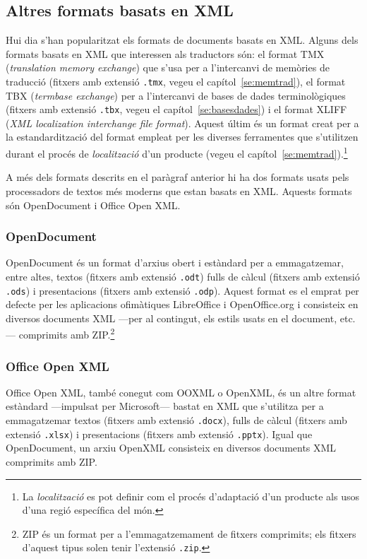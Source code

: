 \subsection{Altres formats basats en XML}
Hui dia s'han popularitzat els formats de documents basats en
XML. Alguns dels formats basats en XML que interessen als traductors
són: el format TMX (\emph{translation memory exchange}) que s'usa per
a l'intercanvi de memòries de traducció (fitxers amb extensió
\texttt{.tmx}, vegeu el capítol~\ref{se:memtrad}), el format TBX
(\emph{termbase exchange}) per a l'intercanvi de bases de dades
terminològiques (fitxers amb extensió \texttt{.tbx}, vegeu el
capítol~\ref{se:basesdades}) i el format XLIFF (\emph{XML localization
  interchange file format}). Aquest últim és un format creat per a la
estandardització del format empleat per les diverses ferramentes que
s'utilitzen durant el procés de \emph{localització} d'un producte
(vegeu el capítol~\ref{se:memtrad}).\footnote{La \emph{localització}
  es pot definir com el procés d'adaptació d'un producte als usos 
d'una regió específica del món.}

A més dels formats descrits en el paràgraf anterior hi ha dos formats
usats pels processadors de textos més moderns que estan basats en
XML. Aquests formats són OpenDocument i Office Open XML. 

\subsubsection{OpenDocument}
OpenDocument és un format d'arxius obert i estàndard per a
emmagatzemar, entre altes, textos (fitxers amb extensió \texttt{.odt})
fulls de càlcul (fitxers amb extensió \texttt{.ods}) i presentacions
(fitxers amb extensió \texttt{.odp}). Aquest format es el emprat per
defecte per les aplicacions ofimàtiques LibreOffice i OpenOffice.org i
consisteix en diversos documents XML ---per al contingut, els
estils usats en el document, etc.--- comprimits amb ZIP.\footnote{ZIP
  és un format per a l'emmagatzemament de fitxers comprimits; els
  fitxers d'aquest tipus solen tenir l'extensió \texttt{.zip}.}

\subsubsection{Office Open XML}
Office Open XML, també conegut com OOXML o OpenXML, és un altre format
estàndard ---impulsat per Microsoft--- bastat en XML que s'utilitza
per a emmagatzemar textos (fitxers amb extensió \texttt{.docx}), fulls
de càlcul (fitxers amb extensió \texttt{.xlsx}) i presentacions
(fitxers amb extensió \texttt{.pptx}). Igual que OpenDocument, un
arxiu OpenXML consisteix en diversos documents XML comprimits amb ZIP.

